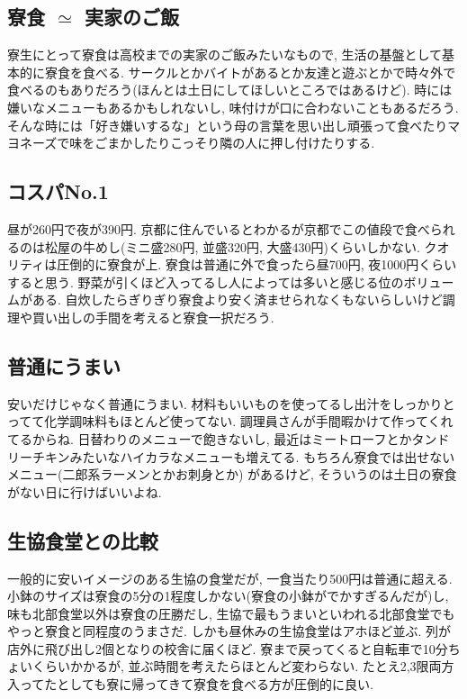 \documentclass[10pt,b5jsbook,dvips,dvipdfmx,openany]{jsbook}
\theoremstyle{definition}
\begin{document}
		\subsection{寮食 $ \simeq $ 実家のご飯}
		寮生にとって寮食は高校までの実家のご飯みたいなもので, 生活の基盤として基本的に寮食を食べる. サークルとかバイトがあるとか友達と遊ぶとかで時々外で食べるのもありだろう(ほんとは土日にしてほしいところではあるけど). 時には嫌いなメニューもあるかもしれないし, 味付けが口に合わないこともあるだろう. そんな時には「好き嫌いするな」という母の言葉を思い出し頑張って食べたりマヨネーズで味をごまかしたりこっそり隣の人に押し付けたりする.

		\subsection{コスパNo.1}
		昼が260円で夜が390円. 京都に住んでいるとわかるが京都でこの値段で食べられるのは松屋の牛めし(ミニ盛280円, 並盛320円, 大盛430円)くらいしかない. クオリティは圧倒的に寮食が上. 寮食は普通に外で食ったら昼700円, 夜1000円くらいすると思う. 野菜が引くほど入ってるし人によっては多いと感じる位のボリュームがある. 自炊したらぎりぎり寮食より安く済ませられなくもないらしいけど調理や買い出しの手間を考えると寮食一択だろう.

		\subsection{普通にうまい}
		安いだけじゃなく普通にうまい. 材料もいいものを使ってるし出汁をしっかりとってて化学調味料もほとんど使ってない. 調理員さんが手間暇かけて作ってくれてるからね. 日替わりのメニューで飽きないし, 最近はミートローフとかタンドリーチキンみたいなハイカラなメニューも増えてる. もちろん寮食では出せないメニュー(二郎系ラーメンとかお刺身とか) があるけど, そういうのは土日の寮食がない日に行けばいいよね.

		\subsection{生協食堂との比較}
		一般的に安いイメージのある生協の食堂だが, 一食当たり500円は普通に超える. 小鉢のサイズは寮食の5分の1程度しかない(寮食の小鉢がでかすぎるんだが)し, 味も北部食堂以外は寮食の圧勝だし, 生協で最もうまいといわれる北部食堂でもやっと寮食と同程度のうまさだ. しかも昼休みの生協食堂はアホほど並ぶ. 列が店外に飛び出し2個となりの校舎に届くほど. 寮まで戻ってくると自転車で10分ちょいくらいかかるが, 並ぶ時間を考えたらほとんど変わらない. たとえ2,3限両方入ってたとしても寮に帰ってきて寮食を食べる方が圧倒的に良い.
\end{document}
